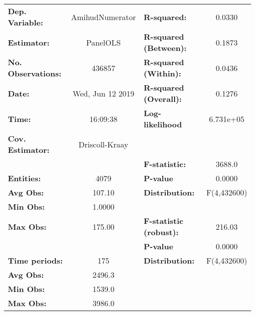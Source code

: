 \begin{center}
\begin{tabular}{lclc}
\toprule
\textbf{Dep. Variable:}                 &  AmihudNumerator   & \textbf{  R-squared:         }   &      0.0330      \\
\textbf{Estimator:}                     &      PanelOLS      & \textbf{  R-squared (Between):}  &      0.1873      \\
\textbf{No. Observations:}              &       436857       & \textbf{  R-squared (Within):}   &      0.0436      \\
\textbf{Date:}                          &  Wed, Jun 12 2019  & \textbf{  R-squared (Overall):}  &      0.1276      \\
\textbf{Time:}                          &      16:09:38      & \textbf{  Log-likelihood     }   &    6.731e+05     \\
\textbf{Cov. Estimator:}                &   Driscoll-Kraay   & \textbf{                     }   &                  \\
\textbf{}                               &                    & \textbf{  F-statistic:       }   &      3688.0      \\
\textbf{Entities:}                      &        4079        & \textbf{  P-value            }   &      0.0000      \\
\textbf{Avg Obs:}                       &       107.10       & \textbf{  Distribution:      }   &   F(4,432600)    \\
\textbf{Min Obs:}                       &       1.0000       & \textbf{                     }   &                  \\
\textbf{Max Obs:}                       &       175.00       & \textbf{  F-statistic (robust):} &      216.03      \\
\textbf{}                               &                    & \textbf{  P-value            }   &      0.0000      \\
\textbf{Time periods:}                  &        175         & \textbf{  Distribution:      }   &   F(4,432600)    \\
\textbf{Avg Obs:}                       &       2496.3       & \textbf{                     }   &                  \\
\textbf{Min Obs:}                       &       1539.0       & \textbf{                     }   &                  \\
\textbf{Max Obs:}                       &       3986.0       & \textbf{                     }   &                  \\

\end{tabular}
\end{center}
